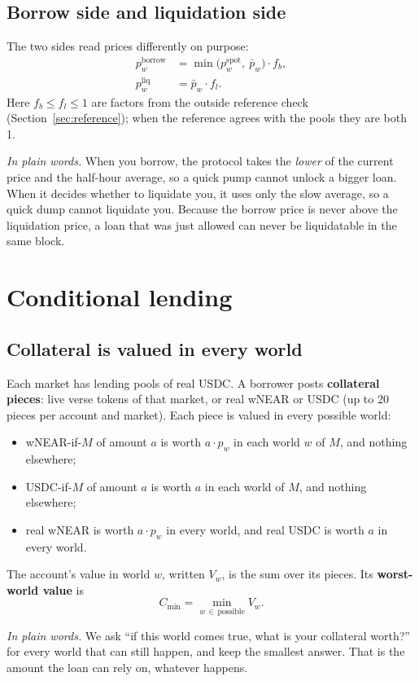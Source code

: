 \documentclass[11pt,a4paper]{article}
\newcommand{\inwords}[1]{\par\noindent\colorbox{note}{\parbox{\dimexpr\linewidth-2\fboxsep}{\small\textit{In plain words.} #1}}\par}
\begin{document}
\subsection{Borrow side and liquidation side}

The two sides read prices differently on purpose:
\begin{align}
  p^{\text{borrow}}_w &= \min\!\big(p^{\text{spot}}_w,\ \bar{p}_w\big) \cdot f_b, \label{eq:pb}\\
  p^{\text{liq}}_w &= \bar{p}_w \cdot f_l. \label{eq:pl}
\end{align}
Here $f_b \le f_l \le 1$ are factors from the outside reference check (Section~\ref{sec:reference}); when the
reference agrees with the pools they are both 1.
\inwords{When you borrow, the protocol takes the \emph{lower} of the current price and the half-hour average, so a
quick pump cannot unlock a bigger loan. When it decides whether to liquidate you, it uses only the slow average, so a
quick dump cannot liquidate you. Because the borrow price is never above the liquidation price, a loan that was just
allowed can never be liquidatable in the same block.}

\section{Conditional lending}
\label{sec:lending}

\subsection{Collateral is valued in every world}

Each market has lending pools of real USDC. A borrower posts \textbf{collateral pieces}: live verse tokens of that
market, or real wNEAR or USDC (up to 20 pieces per account and market). Each piece is valued in every possible world:
\begin{itemize}
  \item wNEAR-if-$M$ of amount $a$ is worth $a \cdot p_w$ in each world $w$ of $M$, and nothing elsewhere;
  \item USDC-if-$M$ of amount $a$ is worth $a$ in each world of $M$, and nothing elsewhere;
  \item real wNEAR is worth $a\cdot p_w$ in every world, and real USDC is worth $a$ in every world.
\end{itemize}
The account's value in world $w$, written $V_w$, is the sum over its pieces. Its \textbf{worst-world value} is
\begin{equation}
  C_{\min} = \min_{w\,\in\,\text{possible}} V_w .
  \label{eq:cmin}
\end{equation}
\inwords{We ask ``if this world comes true, what is your collateral worth?'' for every world that can still happen,
and keep the smallest answer. That is the amount the loan can rely on, whatever happens.}
\end{document}
